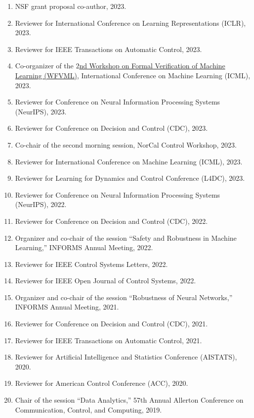 \documentclass[11pt]{article}
\begin{document}
	\begin{enumerate}[label={\arabic*.}]
		\item NSF grant proposal co-author, 2023.
		\item Reviewer for International Conference on Learning Representations (ICLR), 2023.
		\item Reviewer for IEEE Transactions on Automatic Control, 2023.
		\item Co-organizer of the \href{https://www.ml-verification.com/}{$2$nd Workshop on Formal Verification of Machine Learning (WFVML)}, International Conference on Machine Learning (ICML), 2023.
		\item Reviewer for Conference on Neural Information Processing Systems (NeurIPS), 2023.
		\item Reviewer for Conference on Decision and Control (CDC), 2023.
		\item Co-chair of the second morning session, NorCal Control Workshop, 2023.
		\item Reviewer for International Conference on Machine Learning (ICML), 2023.
		\item Reviewer for Learning for Dynamics and Control Conference (L4DC), 2023.
		\item Reviewer for Conference on Neural Information Processing Systems (NeurIPS), 2022.
		\item Reviewer for Conference on Decision and Control (CDC), 2022.
		\item Organizer and co-chair of the session ``Safety and Robustness in Machine Learning,'' INFORMS Annual Meeting, 2022.
		\item Reviewer for IEEE Control Systems Letters, 2022.
		\item Reviewer for IEEE Open Journal of Control Systems, 2022.
		\item Organizer and co-chair of the session ``Robustness of Neural Networks,'' INFORMS Annual Meeting, 2021.
		\item Reviewer for Conference on Decision and Control (CDC), 2021.
		\item Reviewer for IEEE Transactions on Automatic Control, 2021.
		\item Reviewer for Artificial Intelligence and Statistics Conference (AISTATS), 2020.
		\item Reviewer for American Control Conference (ACC), 2020.
		\item Chair of the session ``Data Analytics,'' 57th Annual Allerton Conference on Communication, Control, and Computing, 2019.
	\end{enumerate}
	
\end{document}
